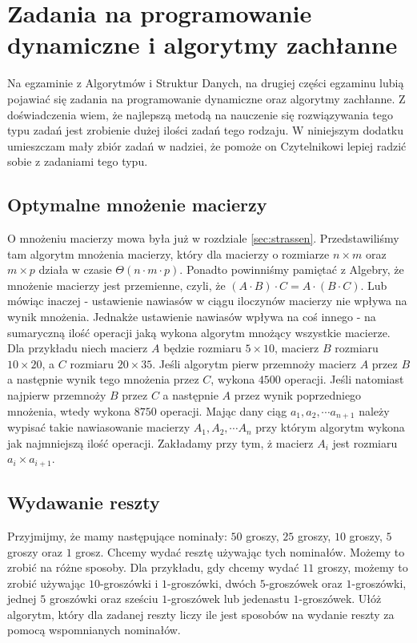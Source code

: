 \chapter{Zadania na programowanie dynamiczne i algorytmy zachłanne}

Na egzaminie z Algorytmów i Struktur Danych, na drugiej części egzaminu lubią pojawiać się zadania na programowanie dynamiczne oraz algorytmy zachłanne.
Z doświadczenia wiem, że najlepszą metodą na nauczenie się rozwiązywania tego typu zadań jest zrobienie dużej ilości zadań tego rodzaju.
W niniejszym dodatku umieszczam mały zbiór zadań w nadziei, że pomoże on Czytelnikowi lepiej radzić sobie z zadaniami tego typu.

\section*{Optymalne mnożenie macierzy}

O mnożeniu macierzy mowa była już w rozdziale \ref{sec:strassen}.
Przedstawiliśmy tam algorytm mnożenia macierzy, który dla macierzy o rozmiarze $n \times m$ oraz $m \times p$ działa w czasie $\Theta(n \cdot m \cdot p)$.
Ponadto powinniśmy pamiętać z Algebry, że mnożenie macierzy jest przemienne, czyli, że $(A \cdot B) \cdot C = A \cdot (B \cdot C)$.
Lub mówiąc inaczej - ustawienie nawiasów w ciągu iloczynów macierzy nie wpływa na wynik mnożenia.
Jednakże ustawienie nawiasów wpływa na coś innego - na sumaryczną ilość operacji jaką wykona algorytm mnożący wszystkie macierze.
Dla przykładu niech macierz $A$ będzie rozmiaru $5 \times 10$, macierz $B$ rozmiaru $10 \times 20$, a $C$ rozmiaru $20 \times 35$.
Jeśli algorytm pierw przemnoży macierz $A$ przez $B$ a następnie wynik tego mnożenia przez $C$, wykona $4500$ operacji.
Jeśli natomiast najpierw przemnoży $B$ przez $C$ a następnie $A$ przez wynik poprzedniego mnożenia, wtedy wykona $8750$ operacji.
Mając dany ciąg $a_1, a_2, \cdots a_{n+1}$ należy wypisać takie nawiasowanie macierzy $A_1, A_2, \cdots A_n$ przy którym algorytm wykona jak najmniejszą ilość operacji.
Zakładamy przy tym, ż macierz $A_i$ jest rozmiaru $a_i \times a_{i+1}$.

\section*{Wydawanie reszty}

Przyjmijmy, że mamy następujące nominały: $50$ groszy, $25$ groszy, $10$ groszy, $5$ groszy oraz $1$ grosz.
Chcemy wydać resztę używając tych nominałów.
Możemy to zrobić na różne sposoby.
Dla przykładu, gdy chcemy wydać $11$ groszy, możemy to zrobić używając $10$-groszówki i $1$-groszówki, dwóch $5$-groszówek oraz $1$-groszówki, jednej $5$ groszówki oraz sześciu $1$-groszówek lub jedenastu $1$-groszówek.
Ułóż algorytm, który dla zadanej reszty liczy ile jest sposobów na wydanie reszty za pomocą wspomnianych nominałów.

